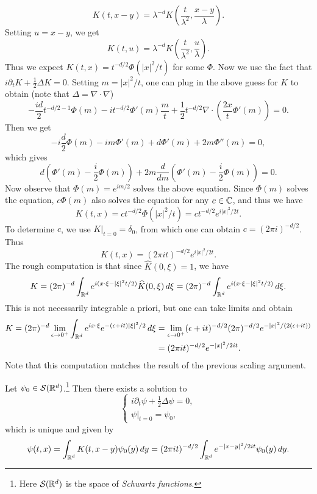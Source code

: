 \begin{example}
\begin{enumerate}
      \[
        K(t, x - y) = \lambda^{-d} K\left(\frac{t}{\lambda^2}, \frac{x - y}{\lambda}\right).
      \]
      Setting $u = x - y$, we get
      \[
        K(t, u) = \lambda^{-d} K\left(\frac{t}{\lambda^2}, \frac{u}{\lambda}\right).
      \]
      Thus we expect
      $K(t, x) = t^{-d / 2} \Phi(|x|^2 / t)$
      for some $\Phi$. Now we use the fact that
      $i \partial_t K + \frac{1}{2} \Delta K = 0$.
      Setting $m = |x|^2 / t$, one can
      plug in the above guess for $K$ to obtain
      (note that $\Delta = \nabla \cdot \nabla$)
      \[
        -\frac{id}{2} t^{-d / 2 - 1} \Phi(m)
        - it^{-d / 2} \Phi'(m) \frac{m}{t}
        + \frac{1}{2} t^{-d / 2} \nabla \cdot \left(\frac{2x}{t} \Phi'(m)\right) = 0.
      \]
      Then we get
      \[
        -i \frac{d}{2} \Phi(m) - im \Phi'(m)
        + d \Phi'(m) + 2m \Phi''(m) = 0,
      \]
      which gives
      \[
        d\left(\Phi'(m) - \frac{i}{2} \Phi(m)\right)
        + 2m \frac{d}{dm} \left(\Phi'(m) - \frac{i}{2}\Phi(m)\right) = 0.
      \]
      Now observe that
      $\Phi(m) = e^{im / 2}$ solves the above equation.
      Since $\Phi(m)$ solves the
      equation, $c \Phi(m)$ also solves the equation for
      any $c \in \mathbb{C}$, and thus we have
      \[
        K(t, x) = c t^{-d / 2} \Phi(|x|^2 / t)
        = c t^{-d / 2} e^{i|x|^2 / 2t}.
      \]
      To determine $c$, we use $K|_{t = 0} = \delta_0$,
      from which one can obtain $c = (2\pi i)^{-d / 2}$. Thus
      \[
        K(t, x) = (2\pi it)^{-d / 2} e^{i|x|^2 / 2t}.
      \]
      The rough computation is that since
      $\widehat{K}(0, \xi) = 1$, we have
      \[
        K = (2\pi)^{-d} \int_{\mathbb{R}^d} e^{i(x \cdot \xi - |\xi|^2 t / 2)} \widehat{K}(0, \xi)\, d\xi
        = (2\pi)^{-d} \int_{\mathbb{R}^d} e^{i(x \cdot \xi - |\xi|^2 t / 2)}\, d\xi.
      \]
      This is not necessarily integrable a priori,
      but one can take limits and obtain
      \begin{align*}
        K
        = (2\pi)^{-d} \lim_{\epsilon \to 0^+}
        \int_{\mathbb{R}^d} e^{ix \cdot \xi} e^{-(\epsilon + it)|\xi|^2 / 2}\, d\xi
        &= \lim_{\epsilon \to 0^+} (\epsilon + it)^{-d / 2} (2\pi)^{-d / 2} e^{-|x|^2 / (2(\epsilon + it))} \\
        &= (2\pi it)^{-d / 2} e^{-|x|^2 / 2it}.
      \end{align*}
      Note that this computation matches the result
      of the previous scaling argument.
  \end{enumerate}
\end{example}

\begin{theorem}
  Let $\psi_0 \in \mathcal{S}(\mathbb{R}^d)$.\footnote{Here $\mathcal{S}(\mathbb{R}^d)$ is the space of \emph{Schwartz functions}.}
  Then there exists a solution to
  \[
    \begin{cases}
      i \partial_t \psi + \frac{1}{2} \Delta \psi = 0, \\
      \psi|_{t = 0} = \psi_0,
    \end{cases}
  \]
  which is unique and given by
  \[
    \psi(t, x) = \int_{\mathbb{R}^d} K(t, x - y) \psi_0(y)\, dy
    = (2\pi it)^{-d / 2} \int_{\mathbb{R}^d} e^{-|x - y|^2 / 2it} \psi_0(y)\, dy.
  \]
\end{theorem}

